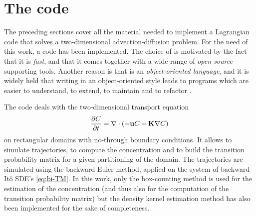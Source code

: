 \section{The code}
The preceding sections cover all the material needed to implement a Lagrangian code that solves a two-dimensional advection-diffusion problem. For the need of this work, a \Cpp code has been implemented. The choice of \Cpp is motivated by the fact that it is \textit{fast}, and that it comes together with a wide range of \textit{open source} supporting tools. Another reason is that \Cpp is an \textit{object-oriented language}, and it is widely held that writing in an object-oriented style leads to programs which are easier to understand, to extend, to maintain and to refactor \cite{pitt2012guide}.

The code deals with the two-dimensional transport equation
\begin{equation} \label{eq:TEcode}
	\frac{\partial C}{\partial t} = \nabla \cdot (-\mathbf u C + \mathbf K \nabla C)
\end{equation}
on rectangular domains with no-through boundary conditions. It allows to simulate trajectories, to compute the concentration and to build the transition probability matrix for a given partitioning of the domain. The trajectories are simulated using the backward Euler method, applied on the system of backward Itô SDE's \eqref{eq:bi-TM}.
In this work, only the box-counting method is used for the estimation of the concentration (and thus also for the computation of the transition probability matrix) but the density kernel estimation method has also been implemented for the sake of completeness.

